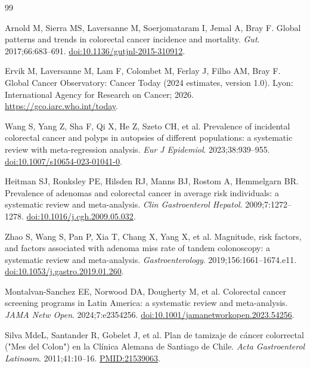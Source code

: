 \documentclass[10pt,a4paper]{article}
\begin{document}
\clearpage
\begin{thebibliography}{99}
\small
\raggedright
\setlength{\itemsep}{1pt}
\setlength{\parskip}{0pt}

Arnold M, Sierra MS, Laversanne M, Soerjomataram I, Jemal A, Bray F.
Global patterns and trends in colorectal cancer incidence and mortality.
\textit{Gut}. 2017;66:683--691.
\href{https://doi.org/10.1136/gutjnl-2015-310912}{doi:10.1136/gutjnl-2015-310912}.

Ervik M, Laversanne M, Lam F, Colombet M, Ferlay J, Filho AM, Bray F.
Global Cancer Observatory: Cancer Today (2024 estimates, version 1.0).
Lyon: International Agency for Research on Cancer; 2026.
\url{https://gco.iarc.who.int/today}.

Wang S, Yang Z, Sha F, Qi X, He Z, Szeto CH, et al.
Prevalence of incidental colorectal cancer and polyps in autopsies of
different populations: a systematic review with meta-regression analysis.
\textit{Eur J Epidemiol}. 2023;38:939--955.
\href{https://doi.org/10.1007/s10654-023-01041-0}{doi:10.1007/s10654-023-01041-0}.

Heitman SJ, Ronksley PE, Hilsden RJ, Manns BJ, Rostom A, Hemmelgarn BR.
Prevalence of adenomas and colorectal cancer in average risk individuals:
a systematic review and meta-analysis.
\textit{Clin Gastroenterol Hepatol}. 2009;7:1272--1278.
\href{https://doi.org/10.1016/j.cgh.2009.05.032}{doi:10.1016/j.cgh.2009.05.032}.

Zhao S, Wang S, Pan P, Xia T, Chang X, Yang X, et al.
Magnitude, risk factors, and factors associated with adenoma miss rate of
tandem colonoscopy: a systematic review and meta-analysis.
\textit{Gastroenterology}. 2019;156:1661--1674.e11.
\href{https://doi.org/10.1053/j.gastro.2019.01.260}{doi:10.1053/j.gastro.2019.01.260}.

Montalvan-Sanchez EE, Norwood DA, Dougherty M, et al.
Colorectal cancer screening programs in Latin America: a systematic review
and meta-analysis.
\textit{JAMA Netw Open}. 2024;7:e2354256.
\href{https://doi.org/10.1001/jamanetworkopen.2023.54256}{doi:10.1001/jamanetworkopen.2023.54256}.

Silva MdeL, Santander R, Gobelet J, et al.
Plan de tamizaje de c\'ancer colorrectal ("Mes del Colon") en la
Cl\'inica Alemana de Santiago de Chile.
\textit{Acta Gastroenterol Latinoam}. 2011;41:10--16.
\href{https://pubmed.ncbi.nlm.nih.gov/21539063/}{PMID:21539063}.


\end{thebibliography}
\end{document}
